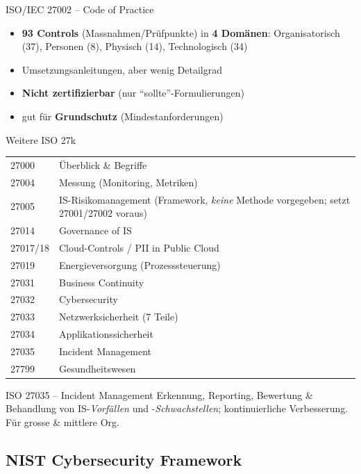 \documentclass[a4paper, fontsize=7pt]{scrartcl}
\renewcommand*{\arraystretch}{1.5}  %
\begin{document}
\begin{mainbox}{ISO/IEC 27002 -- Code of Practice}
\begin{itemize}
    \item \textbf{93 Controls} (Massnahmen/Prüfpunkte) in \textbf{4 Domänen}:
          Organisatorisch (37), Personen (8), Physisch (14), Technologisch (34)
    \item Umsetzungsanleitungen, aber wenig Detailgrad
    \item \textbf{Nicht zertifizierbar} (nur ``sollte''-Formulierungen)
    \item gut für \textbf{Grundschutz} (Mindestanforderungen)
\end{itemize}
\end{mainbox}

\begin{mainbox}{Weitere ISO 27k}
\renewcommand*{\arraystretch}{1.15}
\begin{tabularx}{\linewidth}{@{}l|X@{}}
27000 & Überblick \& Begriffe \\
27004 & Messung (Monitoring, Metriken) \\
27005 & IS-Risikomanagement (Framework, \emph{keine} Methode vorgegeben;
setzt 27001/27002 voraus) \\
27014 & Governance of IS \\
27017/18 & Cloud-Controls / PII in Public Cloud \\
27019 & Energieversorgung (Prozesssteuerung) \\
27031 & Business Continuity \\
27032 & Cybersecurity \\
27033 & Netzwerksicherheit (7 Teile) \\
27034 & Applikationssicherheit \\
27035 & Incident Management \\
27799 & Gesundheitswesen \\
\end{tabularx}
\end{mainbox}

\begin{subbox}{ISO 27035 -- Incident Management}
Erkennung, Reporting, Bewertung \& Behandlung von IS-\emph{Vorfällen} und
-\emph{Schwachstellen}; kontinuierliche Verbesserung. Für grosse \& mittlere Org.
\end{subbox}

\subsection{NIST Cybersecurity Framework}
\end{document}
